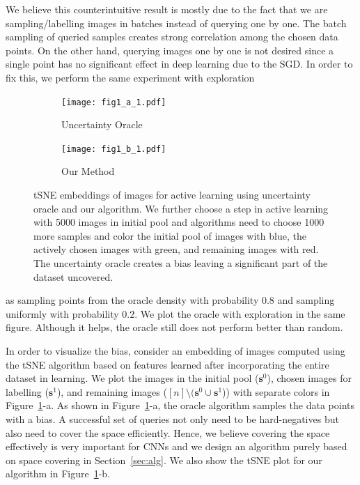 \documentclass{article}
\begin{document}
We believe this counterintuitive result is mostly due to the fact that we are sampling/labelling images in batches instead of querying one by one. The batch sampling of queried samples creates strong correlation among the chosen data points.  On the other hand, querying images one by one is not desired since a single point has no significant effect in deep learning due to the SGD. In order to fix this, we perform the same experiment with exploration%
\begin{figure}
\vspace{-5mm}
  \begin{center}
    \begin{subfigure}[b]{0.23\textwidth}
		\texttt{[image: fig1\_a\_1.pdf]}
		\vspace{-7mm}
		\caption{Uncertainty Oracle}
    \end{subfigure}
    \begin{subfigure}[b]{0.23\textwidth}
		\texttt{[image: fig1\_b\_1.pdf]}
		\vspace{-7mm}
		\caption{Our Method}
    \end{subfigure}
\end{center}
\vspace{-3mm}
 \caption{tSNE embeddings of images for active learning using uncertainty oracle and our algorithm. We further choose a step in active learning with 5000 images in initial pool and algorithms need to choose 1000 more samples and color the initial pool of images with blue, the actively chosen images with green, and remaining images with red. The uncertainty oracle creates a bias leaving a significant part of the dataset uncovered. }
\label{fig:tsne}
\vspace{-5mm}
\end{figure}
 \noindent   as sampling points from the oracle density with probability $0.8$ and sampling uniformly with probability $0.2$. We plot the oracle with exploration in the same figure. Although it helps, the oracle still does not perform better than random.

In order to visualize the bias, consider an embedding of images computed using the tSNE\cite{tsne} algorithm based on features learned after incorporating the entire dataset in learning. We plot the images in the initial pool ($\mathbf{s}^0$), chosen images for labelling ($\mathbf{s}^1$), and remaining images ($[n] \setminus (\mathbf{s}^0 \cup \mathbf{s}^1$)) with separate colors in Figure~\ref{fig:tsne}-a. As shown in Figure~\ref{fig:tsne}-a, the oracle algorithm samples the data points with a bias. A successful set of queries not only need to be hard-negatives but also need to cover the space efficiently. Hence, we believe covering the space effectively is very important for CNNs and we design an algorithm purely based on space covering in Section~\ref{sec:alg}. We also show the tSNE plot for our algorithm in Figure~\ref{fig:tsne}-b.
\end{document}
